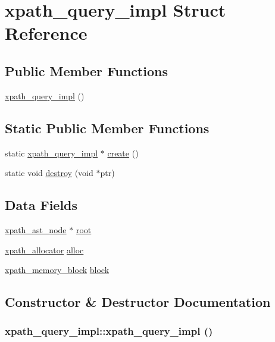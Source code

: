 \hypertarget{structxpath__query__impl}{
\section{xpath\_\-query\_\-impl Struct Reference}
\label{structxpath__query__impl}
}
\subsection*{Public Member Functions}
\begin{CompactItemize}
\item 
\hyperlink{structxpath__query__impl_57ef8fcfa3f46e6c395edb00328e9a0e}{xpath\_\-query\_\-impl} ()
\end{CompactItemize}
\subsection*{Static Public Member Functions}
\begin{CompactItemize}
\item 
static \hyperlink{structxpath__query__impl}{xpath\_\-query\_\-impl} $\ast$ \hyperlink{structxpath__query__impl_fcf45bb9a20a4117b1e963d83277aa7f}{create} ()
\item 
static void \hyperlink{structxpath__query__impl_9b7194b1356cca3f3b62f4cdb8d8960f}{destroy} (void $\ast$ptr)
\end{CompactItemize}
\subsection*{Data Fields}
\begin{CompactItemize}
\item 
\hyperlink{classxpath__ast__node}{xpath\_\-ast\_\-node} $\ast$ \hyperlink{structxpath__query__impl_d25499e0c8391005e3a1a60633d631fe}{root}
\item 
\hyperlink{classxpath__allocator}{xpath\_\-allocator} \hyperlink{structxpath__query__impl_e568b8642d48e729f2ccc2a50467c847}{alloc}
\item 
\hyperlink{structxpath__memory__block}{xpath\_\-memory\_\-block} \hyperlink{structxpath__query__impl_3a8af3ceed6a504567656ec6d1b62641}{block}
\end{CompactItemize}


\subsection{Constructor \& Destructor Documentation}
\hypertarget{structxpath__query__impl_57ef8fcfa3f46e6c395edb00328e9a0e}{
\subsubsection[xpath\_\-query\_\-impl]{\setlength{\rightskip}{0pt plus 5cm}xpath\_\-query\_\-impl::xpath\_\-query\_\-impl ()}}
\label{structxpath__query__impl_57ef8fcfa3f46e6c395edb00328e9a0e}





